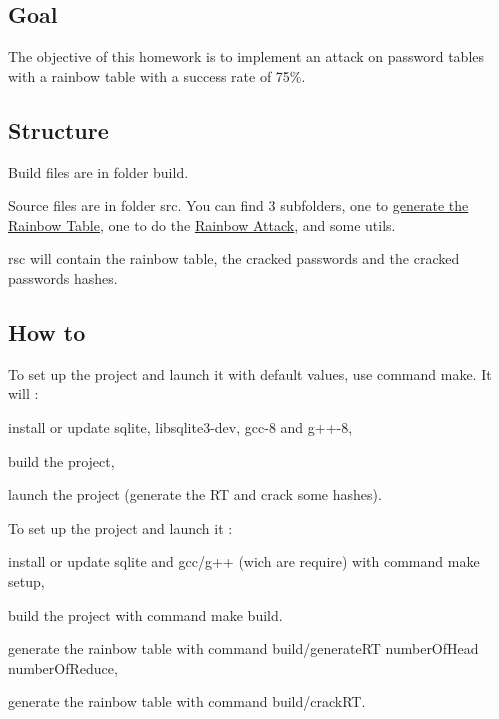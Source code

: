 \subsection*{Goal}

The objective of this homework is to implement an attack on password tables with a rainbow table with a success rate of 75\%.

\subsection*{Structure}

Build files are in folder {\ttfamily build}.

Source files are in folder {\ttfamily src}. You can find 3 subfolders, one to \hyperlink{namespacebe_1_1esi_1_1secl_1_1pn_af8b773cad93b0eb78b89f69721e4bb1d}{generate the Rainbow Table}, one to do the \hyperlink{namespacebe_1_1esi_1_1secl_1_1pn_aad832fb30fa4cc9e74d15d7129d0c929}{Rainbow Attack}, and some utils.

{\ttfamily rsc} will contain the rainbow table, the cracked passwords and the cracked passwords hashes.

\subsection*{How to}

To set up the project and launch it with default values, use command {\ttfamily make}. It will \+:
\begin{DoxyItemize}
\item install or update {\ttfamily sqlite}, {\ttfamily libsqlite3-\/dev}, {\ttfamily gcc-\/8} and {\ttfamily g++-\/8},
\item build the project,
\item launch the project (generate the RT and crack some hashes).
\end{DoxyItemize}

To set up the project and launch it \+:
\begin{DoxyItemize}
\item install or update sqlite and gcc/g++ (wich are require) with command {\ttfamily make setup},
\item build the project with command {\ttfamily make build}.
\item generate the rainbow table with command {\ttfamily build/generate\+RT number\+Of\+Head number\+Of\+Reduce},
\item generate the rainbow table with command {\ttfamily build/crack\+RT}.
\end{DoxyItemize}

